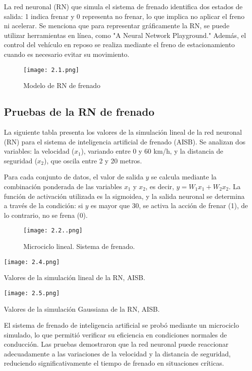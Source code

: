 \documentclass[9pt,twocolumn,twoside]{article} %
\begin{document}
La red neuronal (RN) que simula el sistema de frenado identifica dos estados de salida: 1 indica frenar y 0 representa no frenar, lo que implica no aplicar el freno ni acelerar. Se menciona que para representar gráficamente la RN, se puede utilizar herramientas en línea, como "A Neural Network Playground." Además, el control del vehículo en reposo se realiza mediante el freno de estacionamiento cuando es necesario evitar su movimiento.
\begin{figure}[!htb]
\centering
\texttt{[image: 2.1.png]}
\caption{Modelo de RN de frenado}
\label{Diagrama RPC}
\end{figure}

\subsection{\textbf{Pruebas de la RN de frenado}}
La siguiente tabla presenta los valores de la simulación lineal de la red neuronal (RN) para el sistema de inteligencia artificial de frenado (AISB). Se analizan dos variables: la velocidad (\(x_1\)), variando entre 0 y 60 km/h, y la distancia de seguridad (\(x_2\)), que oscila entre 2 y 20 metros.

Para cada conjunto de datos, el valor de salida \(y\) se calcula mediante la combinación ponderada de las variables \(x_1\) y \(x_2\), es decir, \(y = W_1 x_1 + W_2 x_2\). La función de activación utilizada es la sigmoidea, y la salida neuronal se determina a través de la condición: si \(y\) es mayor que 30, se activa la acción de frenar (1), de lo contrario, no se frena (0).
\begin{figure}[!htb]
\centering
\texttt{[image: 2.2..png]}
\caption{Microciclo lineal. Sistema de frenado.}
\label{simulación}
\end{figure}

\begin{table}[!htb]
\centering
\texttt{[image: 2.4.png]}
\caption{Valores de la simulación lineal de la RN, AISB.}
\label{Tabla_simulacion}
\end{table}

\begin{table}[!htb]
\centering
\texttt{[image: 2.5.png]}
\caption{Valores de la simulación Gaussiana de la RN, AISB.}
\label{Diagrama_RPC}
\end{table}

El sistema de frenado de inteligencia artificial se probó mediante un microciclo simulado, lo que permitió verificar su eficiencia en condiciones normales de conducción. Las pruebas demostraron que la red neuronal puede reaccionar adecuadamente a las variaciones de la velocidad y la distancia de seguridad, reduciendo significativamente el tiempo de frenado en situaciones críticas.
\end{document}
